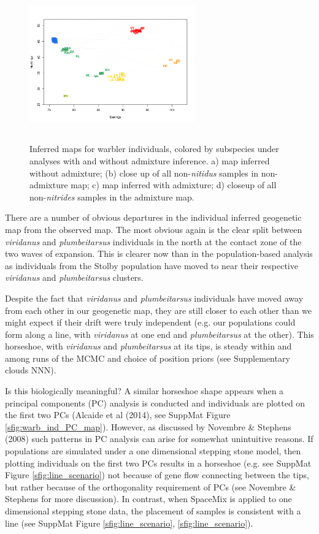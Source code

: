 \documentclass[12pt]{article}
\begin{document}
\begin{figure}
			{\includegraphics[width=2.8in,height=2.3in]{figs/warblers/individual_warbler_map_arrows_randpr1_closeup.png}}
	\caption{Inferred maps for warbler individuals, colored by subspecies under analyses with and without admixture inference. a) map inferred without admixture; (b) close up of all non-\textit{nitidus} samples in non-admixture map; c) map inferred with admixture; d) closeup of all non-\textit{nitrides} samples in the admixture map.}\label{sfig:warbler_ind_maps}
\end{figure}

There are a number of obvious departures in the individual inferred geogenetic map from the observed map. The most obvious again is the clear split between \textit{viridanus} and \textit{plumbeitarsus} individuals in the north at the contact zone of the two waves of expansion.  This is clearer now than in the population-based analysis as individuals from the Stolby population have moved to near their respective \textit{viridanus} and \textit{plumbeitarsus} clusters. 

Despite the fact that \textit{viridanus} and \textit{plumbeitarsus} individuals have moved away from each other in our geogenetic map, they are still closer to each other than we might expect if their drift were truly independent (e.g. our populations could form along a line, with \textit{viridanus} at one end and \textit{plumbeitarsus} at the other). This horseshoe, with \textit{viridanus} and \textit{plumbeitarsus} at its tips, is steady within and among runs of the MCMC and choice of position priors (see Supplementary clouds NNN).  

Is this biologically meaningful?  A similar horseshoe shape appears when a principal components (PC) analysis is conducted and individuals are plotted on the first two PCs (Alcaide et al (2014), see SuppMat Figure \ref{sfig:warb_ind_PC_map}). However, as discussed by Novembre \& Stephens (2008) such patterns in PC analysis can arise for somewhat unintuitive reasons. If populations are simulated under a one dimensional stepping stone model, then plotting individuals on the first two PCs results in a horseshoe (e.g. see SuppMat Figure \ref{sfig:line_scenario}) not because of gene flow connecting between the tips, but rather because of the orthogonality requirement of PCs (see Novembre \& Stephens for more discussion).  In contrast, when SpaceMix is applied to one dimensional stepping stone data, the placement of samples is consistent with a line (see SuppMat Figure  \ref{sfig:line_scenario}, \ref{sfig:line_scenario}).
\end{document}
